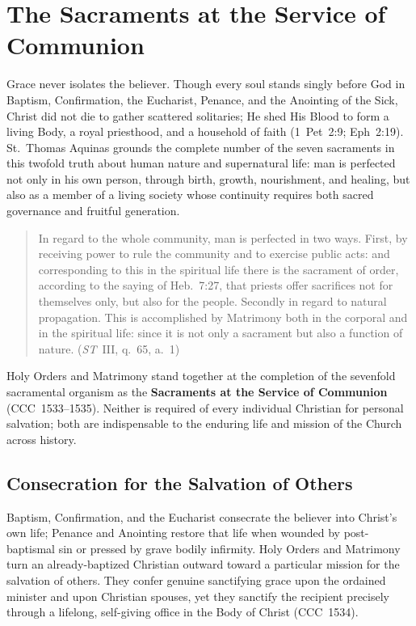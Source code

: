 \section{The Sacraments at the Service of Communion}
\label{sec:communion-introduction}

Grace never isolates the believer. Though every soul stands singly before God in Baptism, Confirmation, the Eucharist, Penance, and the Anointing of the Sick, Christ did not die to gather scattered solitaries; He shed His Blood to form a living Body, a royal priesthood, and a household of faith (1~Pet~2:9; Eph~2:19). St.~Thomas Aquinas grounds the complete number of the seven sacraments in this twofold truth about human nature and supernatural life: man is perfected not only in his own person, through birth, growth, nourishment, and healing, but also as a member of a living society whose continuity requires both sacred governance and fruitful generation.
\begin{quotation}
In regard to the whole community, man is perfected in two ways. First, by receiving power to rule the community and to exercise public acts: and corresponding to this in the spiritual life there is the sacrament of order, according to the saying of Heb.~7:27, that priests offer sacrifices not for themselves only, but also for the people. Secondly in regard to natural propagation. This is accomplished by Matrimony both in the corporal and in the spiritual life: since it is not only a sacrament but also a function of nature. (\emph{ST}~III, q.~65, a.~1)
\end{quotation}
Holy Orders and Matrimony stand together at the completion of the sevenfold sacramental organism as the \textbf{Sacraments at the Service of Communion} (CCC~1533--1535). Neither is required of every individual Christian for personal salvation; both are indispensable to the enduring life and mission of the Church across history.

\subsection{Consecration for the Salvation of Others}
\label{subsec:communion-consecration}

Baptism, Confirmation, and the Eucharist consecrate the believer into Christ's own life; Penance and Anointing restore that life when wounded by post-baptismal sin or pressed by grave bodily infirmity. Holy Orders and Matrimony turn an already-baptized Christian outward toward a particular mission for the salvation of others. They confer genuine sanctifying grace upon the ordained minister and upon Christian spouses, yet they sanctify the recipient precisely through a lifelong, self-giving office in the Body of Christ (CCC~1534).

